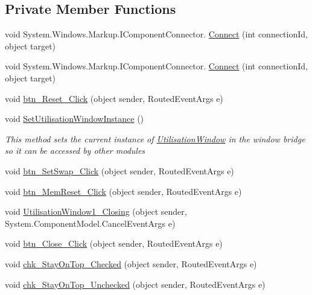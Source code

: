 \subsection*{Private Member Functions}
\begin{DoxyCompactItemize}
\item 
void System.\+Windows.\+Markup.\+I\+Component\+Connector. \hyperlink{class_c_p_u___o_s___simulator_1_1_utilisation_window_a97df3234e18d7c4aa6fab7f061db9f37}{Connect} (int connection\+Id, object target)
\item 
void System.\+Windows.\+Markup.\+I\+Component\+Connector. \hyperlink{class_c_p_u___o_s___simulator_1_1_utilisation_window_a97df3234e18d7c4aa6fab7f061db9f37}{Connect} (int connection\+Id, object target)
\item 
void \hyperlink{class_c_p_u___o_s___simulator_1_1_utilisation_window_a0dc6503f9fc759dd31c01ebd5f37804c}{btn\+\_\+\+Reset\+\_\+\+Click} (object sender, Routed\+Event\+Args e)
\item 
void \hyperlink{class_c_p_u___o_s___simulator_1_1_utilisation_window_a359a3ec3583fb6085f00b74a8deb2a90}{Set\+Utilisation\+Window\+Instance} ()
\begin{DoxyCompactList}\small\item\em This method sets the current instance of \hyperlink{class_c_p_u___o_s___simulator_1_1_utilisation_window}{Utilisation\+Window} in the window bridge so it can be accessed by other modules \end{DoxyCompactList}\item 
void \hyperlink{class_c_p_u___o_s___simulator_1_1_utilisation_window_aed023b6f80654f157d65b7e53a244aa8}{btn\+\_\+\+Set\+Swap\+\_\+\+Click} (object sender, Routed\+Event\+Args e)
\item 
void \hyperlink{class_c_p_u___o_s___simulator_1_1_utilisation_window_aec297d4f0a382426a2f7daaef458306b}{btn\+\_\+\+Mem\+Reset\+\_\+\+Click} (object sender, Routed\+Event\+Args e)
\item 
void \hyperlink{class_c_p_u___o_s___simulator_1_1_utilisation_window_aa5778dbb0ff4540b716001b327b24eb3}{Utilisation\+Window1\+\_\+\+Closing} (object sender, System.\+Component\+Model.\+Cancel\+Event\+Args e)
\item 
void \hyperlink{class_c_p_u___o_s___simulator_1_1_utilisation_window_a5a9475496687f51fa160851a5641c46e}{btn\+\_\+\+Close\+\_\+\+Click} (object sender, Routed\+Event\+Args e)
\item 
void \hyperlink{class_c_p_u___o_s___simulator_1_1_utilisation_window_a09e06074e4a466c4579efa7d4eef2d61}{chk\+\_\+\+Stay\+On\+Top\+\_\+\+Checked} (object sender, Routed\+Event\+Args e)
\item 
void \hyperlink{class_c_p_u___o_s___simulator_1_1_utilisation_window_a320418083c8d16537e7d02bf8b1db8b7}{chk\+\_\+\+Stay\+On\+Top\+\_\+\+Unchecked} (object sender, Routed\+Event\+Args e)
\end{DoxyCompactItemize}
